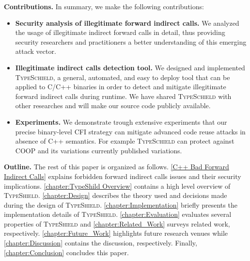 \textbf{Contributions.} In summary, we make the following contributions:
\label{Contribution}
\begin{itemize}
 \item \textbf{Security analysis of illegitimate forward indirect calls.} 
 We analyzed the usage of illegitimate indirect forward calls in detail,
 thus providing security researchers and
practitioners a better understanding of this emerging
attack vector.

 \item \textbf{Illegitimate indirect calls detection tool.}
 We designed and implemented \textsc{TypeSchield}, a general, automated, and easy to deploy tool
 that can be applied to C/C++ binaries in order to detect and mitigate illegitimate forward indirect calls 
 during runtime. We have shared \textsc{TypeSchield} with other researches and will make our source code 
 publicly available.
 
 \item \textbf{Experiments.} We demonstrate trough extensive experiments that our precise
 binary-level CFI strategy can mitigate advanced code reuse attacks in absence of C++ semantics.
 For example \textsc{TypeSchield} can protect against COOP and its variations currently published 
 variations.
  
\end{itemize}

\label{Outline}
\textbf{Outline.} The rest of this paper is organized as follows.
\cref{C++ Bad Forward Indirect Calls} explains forbidden forward indirect calls issues and their security implications.
\cref{chapter:TypeShild Overview} contains a high level overview of \textsc{TypeShield}.
\cref{chapter:Design} describes the theory used and decisions made during the design of \textsc{TypeShield}.
\cref{chapter:Implementation} briefly presents the implementation details of \textsc{TypeShield}.
\cref{chapter:Evaluation} evaluates several properties of \textsc{TypeShield} and
\cref{chapter:Related_Work} surveys related work, respectively.
\cref{chapter:Future_Work} highlights future research venues while 
\cref{chapter:Discussion} contains the discussion, respectively.
Finally, \cref{chapter:Conclusion} concludes this paper.


